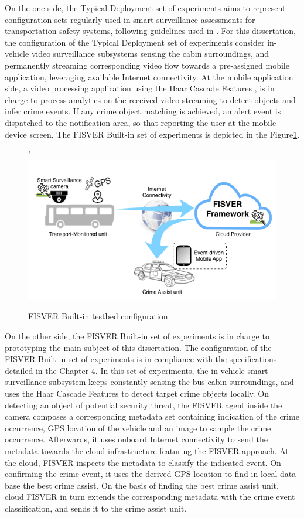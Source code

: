 On the one side, the Typical Deployment set of experiments aims to represent configuration sets regularly used in smart surveillance assessments for transportation-safety systems, following guidelines used in \cite{Typtest1}. For this dissertation, the configuration of the Typical Deployment set of experiments consider in-vehicle video surveillance subsystems sensing the cabin surroundings, and permanently streaming corresponding video flow towards a pre-assigned mobile application, leveraging available Internet connectivity. At the mobile application side, a video processing application using the Haar Cascade Features \cite{peng2011}, is in charge to process analytics on the received video streaming to detect objects and infer crime events. If any crime object matching is achieved, an alert event is dispatched to the notification area, so that reporting the user at the mobile device screen. The FISVER Built-in set of experiments is depicted in the Figure\ref{fig:fradep}.

\begin{figure}[!htb]'
	\centering
 	\includegraphics[scale=0.8]{Imagens/cap5_fisver_testbed.png}
 	\caption{FISVER Built-in testbed configuration}
 	\label{fig:fradep}
\end{figure}

On the other side, the FISVER Built-in set of experiments is in charge to prototyping the main subject of this dissertation. The configuration of the FISVER Built-in set of experiments is in compliance with the specifications detailed in the Chapter 4. In this set of experiments, the in-vehicle smart surveillance subsystem keeps constantly sensing the bus cabin surroundings, and uses the Haar Cascade Features to detect target crime objects locally. On detecting an object of potential security threat, the FISVER agent inside the camera composes a corresponding metadata set containing indication of the crime occurrence, GPS location of the vehicle and an image to sample the crime occurrence. Afterwards, it uses onboard Internet connectivity to send the metadata towards the cloud infrastructure featuring the FISVER approach. At the cloud, FISVER inspects the metadata to classify the indicated event. On confirming the crime event, it uses the derived GPS location to find in local data base the best crime assist. On the basis of finding the best crime assist unit, cloud FISVER in turn extends the corresponding metadata with the crime event classification, and sends it to the crime assist unit. 

